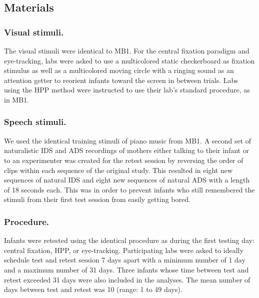 \documentclass[
  man,floatsintext]{apa6}
\begin{document}
\hypertarget{materials}{%
\subsection{Materials}\label{materials}}

\hypertarget{visual-stimuli.}{%
\subsubsection{Visual stimuli.}\label{visual-stimuli.}}

The visual stimuli were identical to MB1. For the central fixation paradigm and eye-tracking, labs were asked to use a multicolored static checkerboard as fixation stimulus as well as a multicolored moving circle with a ringing sound as an attention getter to reorient infants toward the screen in between trials. Labs using the HPP method were instructed to use their lab's standard procedure, as in MB1.

\hypertarget{speech-stimuli.}{%
\subsubsection{Speech stimuli.}\label{speech-stimuli.}}

We used the identical training stimuli of piano music from MB1. A second set of naturalistic IDS and ADS recordings of mothers either talking to their infant or to an experimenter was created for the retest session by reversing the order of clips within each sequence of the original study. This resulted in eight new sequences of natural IDS and eight new sequences of natural ADS with a length of 18 seconds each. This was in order to prevent infants who still remembered the stimuli from their first test session from easily getting bored.

\hypertarget{procedure.}{%
\subsubsection{Procedure.}\label{procedure.}}

Infants were retested using the identical procedure as during the first testing day: central fixation, HPP, or eye-tracking. Participating labs were asked to ideally schedule test and retest session 7 days apart with a minimum number of 1 day and a maximum number of 31 days. Three infants whose time between test and retest exceeded 31 days were also included in the analyses. The mean number of days between test and retest was 10 (range: 1 to 49 days).
\end{document}
